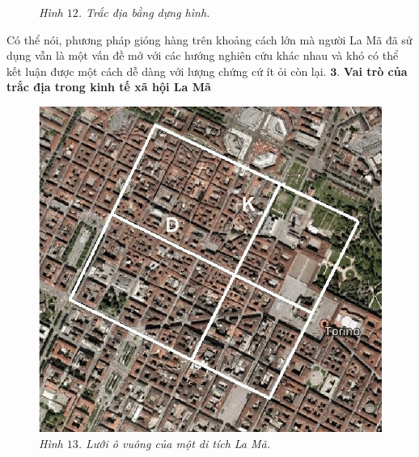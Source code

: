 \begin{multicols}{2}
\begin{figure}[H]
		\caption{\small\textit{\color{toanhocdoisong}Hình $12$. Trắc địa bằng dựng hình.}}
		\vspace*{-10pt}
	\end{figure}
	Có thể nói, phương pháp gióng hàng trên khoảng cách lớn mà người La Mã đã sử dụng vẫn là một vấn đề mở với các hướng nghiên cứu khác nhau và khó có thể kết luận được một cách dễ dàng với lượng chứng cứ ít ỏi còn lại.
	\vskip 0.1cm
	$\pmb{3.}$ \textbf{\color{toanhocdoisong}Vai trò của trắc địa trong kinh tế xã hội La Mã}
	\begin{figure}[H]
		\vspace*{-5pt}
		\centering
		\captionsetup{labelformat= empty, justification=centering}
		\includegraphics[height= 0.7\linewidth]{13}
		\caption{\small\textit{\color{toanhocdoisong}Hình $13$. Lưới ô vuông của một di tích La Mã.}}
		\vspace*{-10pt}
	\end{figure}

\end{multicols}
